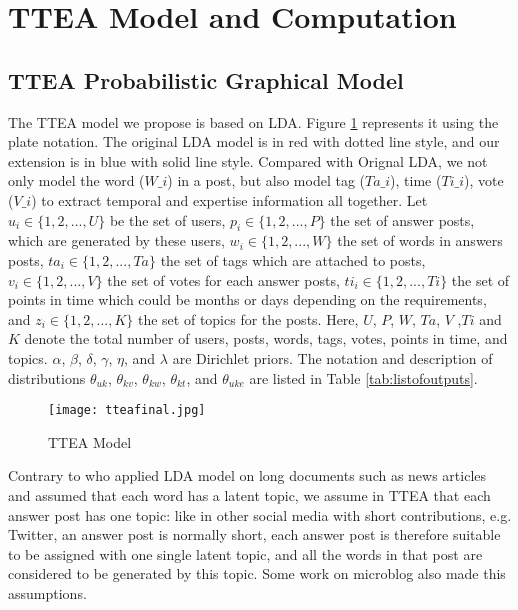 {{{{{{{\section{TTEA Model and Computation}
\subsection{TTEA Probabilistic Graphical Model}

The TTEA model we propose is based on LDA. Figure \ref{fig:tteamodel} represents it using the plate notation. The original LDA model is in red with dotted line style, and our extension is in blue with solid line style. Compared with Orignal LDA, we not only model the word ($W\_i$) in a post, but also model tag ($Ta\_i$), time ($Ti\_i$), vote ($V\_i$) to extract temporal and expertise information all together. Let $u_i \in \{1, 2,..., U\}$ be the set of users, $p_i \in \{1, 2,..., P\}$ the set of answer posts, which are generated by these users, $w_i \in \{1, 2,..., W\}$ the set of words in answers posts, $ta_i \in \{1, 2,..., Ta\}$ the set of tags which are attached to posts, $v_i \in \{1, 2,..., V\}$ the set of votes for each answer posts, $ti_i \in \{1, 2,..., Ti\}$ the set of points in time which could be months or days depending on the requirements, and $z_i \in \{1, 2,..., K\}$ the set of topics for the posts. Here, $U$, $P$, $W$, $Ta$, $V$ ,$Ti$ and $K$ denote the total number of users, posts, words, tags, votes, points in time, and topics. $\alpha$, $\beta$, $\delta$, $\gamma$, $\eta$, and $\lambda$ are Dirichlet priors. The notation and description of distributions $\theta_{uk}$, $\theta_{kv}$, $\theta_{kw}$, $\theta_{kt}$, and $\theta_{uke}$ are listed in Table \ref{tab:listofoutputs}.

\begin{figure}
\centering
\texttt{[image: tteafinal.jpg]}  
\caption{TTEA Model}
\label{fig:tteamodel} 
\end{figure}

Contrary to \cite{blei2003latent} who applied LDA model on long documents such as news articles and assumed that each word has a latent topic, we assume in TTEA that each answer post has one topic: like in other social media with short contributions, e.g. Twitter, an answer post is normally short, each answer post is therefore suitable to be assigned with one single latent topic, and all the words in that post are considered to be generated by this topic. Some work \cite{chp7zhao2011comparing}\cite{chp7diao2012finding} on microblog also made this assumptions.

}}}}}}}
